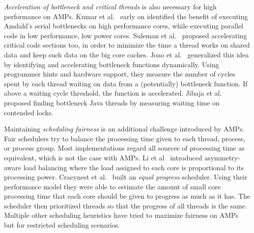 
\emph{Acceleration of bottleneck and critical threads} is also necessary for high performance on AMPs. Kumar et al.~\cite{Kumar:2005:HCM:1100859.1100890} early on identified the benefit of executing Amdahl's serial bottlenecks on high performance cores, while executing parallel code in low performance, low power cores. Suleman et al.~\cite{suleman2009accelerating} proposed accelerating critical code sections too, in order to minimize the time a thread works on shared data and keep such data on the big core caches. Joao et al.~\cite{joao2012bottleneck,joao2013utility} generalized this idea by identifying and accelerating bottleneck functions dynamically. Using programmer hints and hardware support, they measure the number of cycles spent by each thread waiting on data from a (potentially) bottleneck function. If above a waiting cycle threshold, the function is accelerated. Jibaja et al.~\cite{jibaja2016portable} proposed finding bottleneck Java threads by measuring waiting time on contended locks.

Maintaining \emph{scheduling fairness} is an additional challenge introduced by AMPs. Fair schedulers try to balance the processing time given to each thread, process, or process group. Most implementations regard all sources of processing time as equivalent, which is not the case with AMPs. Li et al~\cite{li2007efficient} introduced asymmetry-aware load balancing where the load assigned to each core is proportional to its processing power. Craeynest et al.~\cite{van2013fairness} built an \emph{equal progress} scheduler. Using their performance model they were able to estimate the amount of small core processing time that each core should be given to progress as much as it has. The scheduler then prioritized threads so that the progress of all threads is the same. Multiple other scheduling heuristics have tried to maximize fairness on AMPs~\cite{zahedi2018amdahl,wang2016rebudget,kim2018exploring} but for restricted scheduling scenarios.

